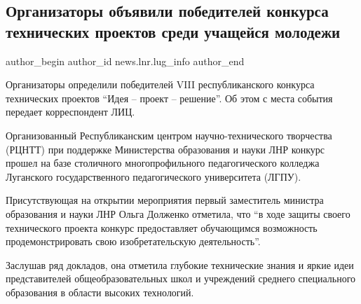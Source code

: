  
 
 
 
 
 
\subsection{Организаторы объявили победителей конкурса технических проектов среди учащейся молодежи}
\label{sec:09_02_2022.stz.news.lnr.lug_info.1.konkurs_tehnika_molodezh}
 
\ifcmt
 author_begin
   author_id news.lnr.lug_info
 author_end
\fi

Организаторы определили победителей VIII республиканского конкурса технических
проектов \enquote{Идея – проект – решение}. Об этом с места события передает
корреспондент ЛИЦ.


Организованный Республиканским центром научно-технического творчества (РЦНТТ)
при поддержке Министерства образования и науки ЛНР конкурс прошел на базе
столичного многопрофильного педагогического колледжа Луганского
государственного педагогического университета (ЛГПУ).


Присутствующая на открытии мероприятия первый заместитель министра образования
и науки ЛНР Ольга Долженко отметила, что \enquote{в ходе защиты своего технического
проекта конкурс предоставляет обучающимся возможность продемонстрировать свою
изобретательскую деятельность}.


Заслушав ряд докладов, она отметила глубокие технические знания и яркие идеи
представителей общеобразовательных школ и учреждений среднего специального
образования в области высоких технологий.

